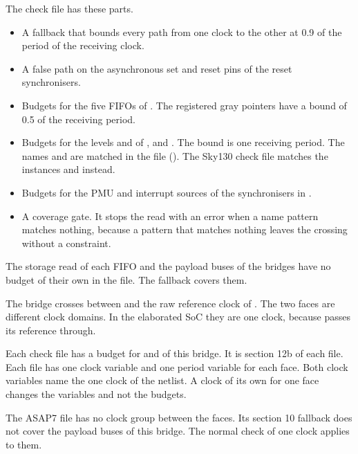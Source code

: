 The check file has these parts.
\begin{itemize}
  \item A fallback that bounds every path from one clock to the other at 0.9 of the period of the receiving clock.
  \item A false path on the asynchronous set and reset pins of the reset synchronisers.
  \item Budgets for the five FIFOs of . The registered gray pointers have a bound of 0.5 of the receiving period.
  \item Budgets for the levels  and  of ,  and . The bound is one receiving period. The names  and  are matched in the file (). The Sky130 check file matches the instances  and  instead.
  \item Budgets for the PMU and interrupt sources of the synchronisers in .
  \item A coverage gate. It stops the read with an error when a name pattern matches nothing, because a pattern that matches nothing leaves the crossing without a constraint.
\end{itemize}
The storage read of each FIFO and the payload buses of the bridges have no budget of their own in the file. The fallback covers them.

The bridge  crosses between  and the raw reference clock of . The two faces are different clock domains. In the elaborated SoC they are one clock, because  passes its reference through.

Each check file has a budget for  and  of this bridge. It is section 12b of each file. Each file has one clock variable and one period variable for each face. Both clock variables name the one clock of the netlist. A clock of its own for one face changes the variables and not the budgets.

The ASAP7 file has no clock group between the faces. Its section 10 fallback does not cover the payload buses of this bridge. The normal check of one clock applies to them.

